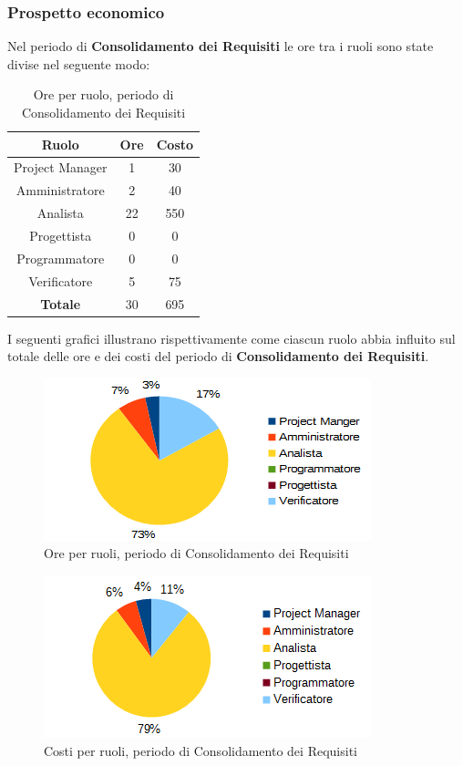 		\subsubsection{Prospetto economico}
		Nel periodo di \textbf{Consolidamento dei Requisiti} le ore tra i ruoli sono state divise nel seguente modo: \\
	\begin{table}[H]
		\centering
		\begin{tabular}{|c|c|c|}
			\hline
			\textbf{Ruolo}		& \textbf{Ore}	& \textbf{Costo} \\
			\hline
			Project Manager		& 1				& 30	\\
			Amministratore		& 2				& 40	\\
			Analista			& 22			& 550	\\
			Progettista			& 0				& 0	\\
			Programmatore		& 0				& 0	\\
			Verificatore		& 5				& 75	\\
			\hline
			\textbf{Totale}		& 30			& 695	\\
			\hline
		\end{tabular}
		\caption{Ore per ruolo, periodo di Consolidamento dei Requisiti}
		\end{table}
	I seguenti grafici illustrano rispettivamente come ciascun ruolo abbia influito sul totale
delle ore e dei costi del periodo di \textbf{Consolidamento dei Requisiti}. \\
	\begin{figure}[H]
		\centering
		\includegraphics[scale=1]{immagini/grafici/analisi_dettaglio-torta.png}
		\caption{Ore per ruoli, periodo di Consolidamento dei Requisiti}
	\end{figure}
	\begin{figure}[H]
		\centering
		\includegraphics[scale=1]{immagini/grafici/analisi_dettaglio-torta-costo.png}
		\caption{Costi per ruoli, periodo di Consolidamento dei Requisiti}
	\end{figure}
